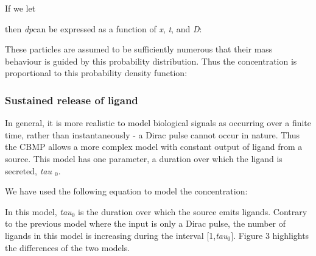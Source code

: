 \documentclass[12pt,a4paper]{report}
\begin{document}
\begin{figure}[H]
\centering
\end{figure}




If we let

\begin{figure}[H]
\centering
\end{figure}


then {\itshape dp}can be expressed as a function of {\itshape x}, 
{\itshape t}, and {\itshape D}:

\begin{figure}[H]
\centering
\end{figure}


These particles are assumed to be sufficiently numerous that their mass 
behaviour is guided by this probability distribution. Thus the 
concentration is proportional to this probability density function:

\begin{figure}[H]
\centering
\end{figure}


\subsubsection{Sustained release of 
ligand}
In general, it is more realistic to model biological signals as 
occurring over a finite time, rather than instantaneously - a Dirac 
pulse cannot occur in nature. Thus the CBMP allows a more complex model 
with constant output of ligand from a source. This model has one 
parameter, a duration over which the ligand is secreted, {\itshape tau
$_{0}$}.



We have used the following equation to model the concentration: 

\begin{figure}[H]
\centering
\end{figure}




In this model, {\itshape tau$_{0}$} is the duration over which the 
source emits ligands. Contrary to the previous model where the input is 
only a Dirac pulse, the number of ligands in this model is increasing 
during the interval $[$1,{\itshape tau$_{0}$}$]$. Figure 3 
highlights the differences of the two models.
\end{document}
